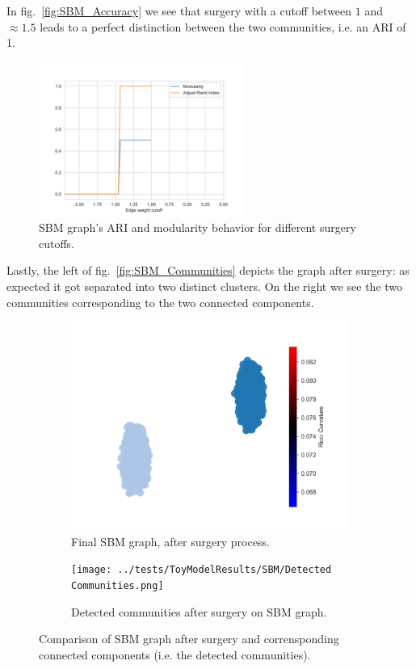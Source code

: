 In fig.~\ref{fig:SBM_Accuracy} we see that surgery with a cutoff between $1$ and $\approx1.5$ leads to a perfect distinction between the two communities, i.e. an ARI of 1.

\begin{figure}
    \centering
    \includegraphics[width=0.6\textwidth]{../tests/ToyModelResults/SBM/Surgery Accuracy.png}
    \caption{SBM graph's ARI and modularity behavior for different surgery cutoffs.}
\end{figure}\label{fig:SBM_Accuracy}

Lastly, the left of fig.~\ref{fig:SBM_Communities} depicts the graph after surgery: as expected it got separated into two distinct clusters. On the right we see the two communities corresponding to the two connected components.
\begin{figure}
    \centering
    \begin{subfigure}{0.45\textwidth}
        \centering
        \includegraphics[width=\textwidth]{../tests/ToyModelResults/SBM/After Surgery.png}
        \caption{Final SBM graph, after surgery process.}
    \end{subfigure}
    \hfill
    \begin{subfigure}{0.45\textwidth}
        \centering
        \texttt{[image: ../tests/ToyModelResults/SBM/Detected Communities.png]}
        \caption{Detected communities after surgery on SBM graph.}
    \end{subfigure}
    \caption{Comparison of SBM graph after surgery and corrensponding connected components (i.e. the detected communities).}
\end{figure}\label{fig:SBM_Communities}


